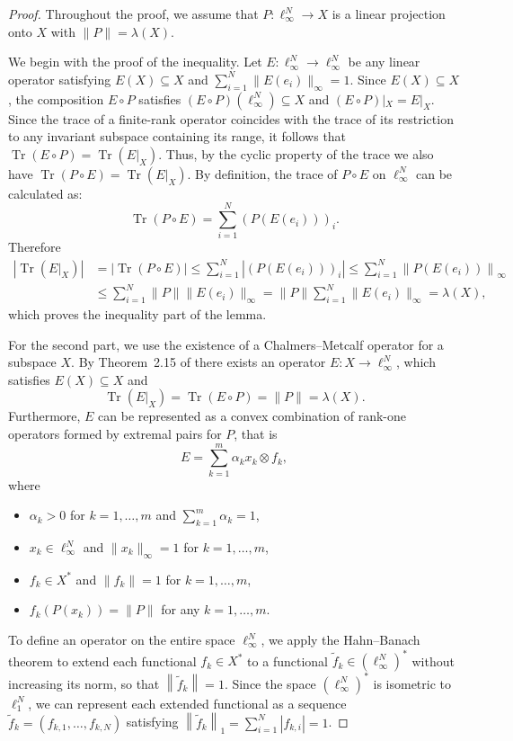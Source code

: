 \documentclass[12pt, reqno]{amsart}
\theoremstyle{definition}
\theoremstyle{remark}
\numberwithin{equation}{section}
\DeclareMathOperator{\tr}{Tr}
\begin{document}
\begin{proof}

Throughout the proof, we assume that $P: \ell_{\infty}^N \to X$ is a linear projection onto $X$ with $\|P\|=\lambda(X)$. 

We begin with the proof of the inequality. Let $E: \ell_{\infty}^N \to \ell_{\infty}^N$ be any linear operator satisfying $E(X) \subseteq X$ and $\sum_{i=1}^N \|E(e_i)\|_{\infty} = 1$. Since $E(X)\subseteq X$, the composition $E\circ P$ satisfies $(E\circ P)(\ell_{\infty}^N)\subseteq X $ and $ (E\circ P)|_X=E|_X$. Since the trace of a finite-rank operator coincides with the trace of its restriction to any invariant subspace containing its range, it follows that $\tr(E\circ P)=\tr(E|_X)$. Thus, by the cyclic property of the trace we also have $\tr(P \circ E) = \tr(E|_X)$. By definition, the trace of $P \circ E$ on $\ell_{\infty}^N$ can be calculated as:
$$\tr(P \circ E) = \sum_{i=1}^N (P(E(e_i)))_{i}.$$
Therefore
\begin{equation}
\label{tracecm}
\begin{split}
\left | \tr(E|_X) \right | &= \left | \tr(P \circ E) \right  | \leq \sum_{i=1}^N \left |(P(E(e_i)))_{i}\right | \leq \sum_{i=1}^{N} \left \| P(E(e_i)) \right \|_{\infty} \\
&\leq \sum_{i=1}^{N} \|P\| \|E(e_i)\|_{\infty} = \|P\| \sum_{i=1}^{N} \|E(e_i)\|_{\infty} = \lambda(X),
\end{split}
\end{equation}
which proves the inequality part of the lemma.

For the second part, we use the existence of a Chalmers--Metcalf operator for a subspace $X$. By Theorem~2.15 of \cite{lewickiskrzypek} there exists an operator $E: X \to \ell_{\infty}^N$, which satisfies $E(X) \subseteq X$ and 
$$\tr(E|_X) = \tr(E \circ P) = \|P\| = \lambda(X).$$ Furthermore, $E$ can be represented as a convex combination of rank-one operators formed by extremal pairs for $P$, that is 
$$E = \sum_{k=1}^m \alpha_k x_k \otimes f_k,$$
where 
\begin{itemize}
\item $\alpha_k > 0$ for $k=1, \ldots, m$ and $\sum_{k=1}^m \alpha_k = 1$, 
\item $x_k \in \ell_{\infty}^N$ and $\|x_k\|_{\infty}=1$ for $k=1, \ldots, m$,
\item $f_k \in X^*$ and $\|f_k\|=1$ for $k=1, \ldots, m$,
\item $f_k(P(x_k))=\|P\|$ for any $k=1, \ldots, m$.
\end{itemize}
To define an operator on the entire space $\ell_{\infty}^N$, we apply the Hahn--Banach theorem to extend each functional $f_k \in X^*$ to a functional $\tilde{f}_k \in (\ell_{\infty}^N)^*$ without increasing its norm, so that $\left \|\tilde{f}_k \right \|= 1$. Since the space $(\ell_{\infty}^N)^*$ is isometric to $\ell_1^N$, we can represent each extended functional as a sequence $\tilde{f}_k = (f_{k,1}, \ldots, f_{k,N})$ satisfying $\left \| \tilde{f}_k \right \|_1 = \sum_{i=1}^N |f_{k,i}| = 1$.


\end{proof}
\end{document}
